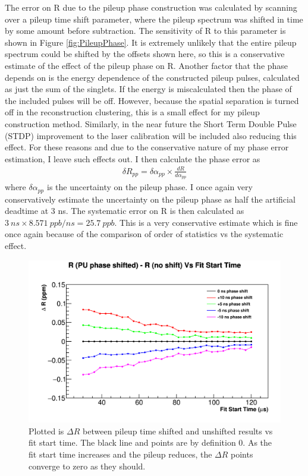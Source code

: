 	The error on R due to the pileup phase construction was calculated by scanning over a pileup time shift parameter, where the pileup spectrum was shifted in time by some amount before subtraction. The sensitivity of R to this parameter is shown in Figure \ref{fig:PileupPhase}. It is extremely unlikely that the entire pileup spectrum could be shifted by the offsets shown here, so this is a conservative estimate of the effect of the pileup phase on R. Another factor that the phase depends on is the energy dependence of the constructed pileup pulses, calculated as just the sum of the singlets. If the energy is miscalculated then the phase of the included pulses will be off. However, because the spatial separation is turned off in the reconstruction clustering, this is a small effect for my pileup construction method. Similarly, in the near future the Short Term Double Pulse (STDP) improvement to the laser calibration will be included also reducing this effect. For these reasons and due to the conservative nature of my phase error estimation, I leave such effects out. I then calculate the phase error as 
		\begin{align}
			\delta R_{pp} = \delta\alpha_{pp} \times \frac{dR}{d\alpha_{pp}}
		\end{align}
	where $\delta\alpha_{pp}$ is the uncertainty on the pileup phase. I once again very conservatively estimate the uncertainty on the pileup phase as half the artificial deadtime at 3 ns. The systematic error on R is then calculated as $\SI{3}{ns} \times \SI{8.571}{ppb/ns} = \SI{25.7}{ppb}$. This is a very conservative estimate which is fine once again because of the comparison of order of statistics vs the systematic effect.

	\begin{figure}[]
		\centering
		\includegraphics[width=.8\textwidth]{pileupTimeShiftComparison}
	    \caption[PileupTimeShiftFS]{Plotted is $\Delta R$ between pileup time shifted and unshifted results vs fit start time. The black line and points are by definition 0. As the fit start time increases and the pileup reduces, the $\Delta R$ points converge to zero as they should.}
	    \label{fig:PileupTimeShiftFS}
	\end{figure}

